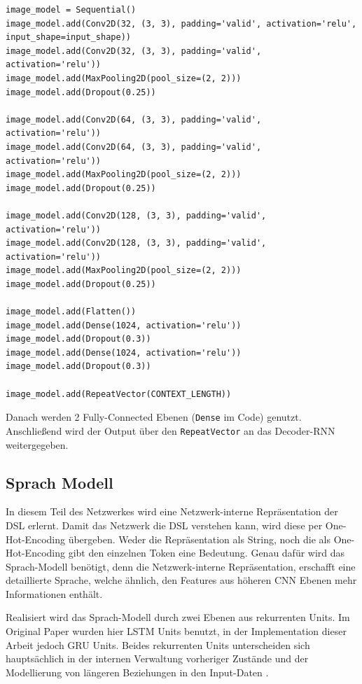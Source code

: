 \documentclass[pdftex,a4paper,halfparskip, article]{scrartcl}
\begin{document}
\begin{verbatim}
image_model = Sequential()
image_model.add(Conv2D(32, (3, 3), padding='valid', activation='relu', 
input_shape=input_shape))
image_model.add(Conv2D(32, (3, 3), padding='valid', activation='relu')) 
image_model.add(MaxPooling2D(pool_size=(2, 2)))
image_model.add(Dropout(0.25))

image_model.add(Conv2D(64, (3, 3), padding='valid', activation='relu'))
image_model.add(Conv2D(64, (3, 3), padding='valid', activation='relu'))
image_model.add(MaxPooling2D(pool_size=(2, 2)))
image_model.add(Dropout(0.25))

image_model.add(Conv2D(128, (3, 3), padding='valid', activation='relu'))
image_model.add(Conv2D(128, (3, 3), padding='valid', activation='relu'))
image_model.add(MaxPooling2D(pool_size=(2, 2)))
image_model.add(Dropout(0.25))

image_model.add(Flatten())
image_model.add(Dense(1024, activation='relu'))
image_model.add(Dropout(0.3))
image_model.add(Dense(1024, activation='relu'))
image_model.add(Dropout(0.3))

image_model.add(RepeatVector(CONTEXT_LENGTH))
\end{verbatim}

Danach werden 2 Fully-Connected Ebenen (\texttt{Dense} im Code) genutzt. Anschließend wird der Output über den \texttt{RepeatVector} an das Decoder-RNN weitergegeben.

\subsection{Sprach Modell}

In diesem Teil des Netzwerkes wird eine Netzwerk-interne Repräsentation der DSL erlernt. Damit das Netzwerk die DSL verstehen kann, wird diese per One-Hot-Encoding übergeben. Weder die Repräsentation als String, noch die als One-Hot-Encoding gibt den einzelnen Token eine Bedeutung. Genau dafür wird das Sprach-Modell benötigt, denn die Netzwerk-interne Repräsentation, erschafft eine detaillierte Sprache, welche ähnlich, den Features aus höheren CNN Ebenen mehr Informationen enthält. 

Realisiert wird das Sprach-Modell durch zwei Ebenen aus rekurrenten Units. Im Original Paper wurden hier LSTM Units benutzt, in der Implementation dieser Arbeit jedoch GRU Units. Beides rekurrenten Units unterscheiden sich hauptsächlich in der internen Verwaltung vorheriger Zustände und der Modellierung von längeren Beziehungen in den Input-Daten \cite{colahsBlogLSTM}. 
\end{document}
